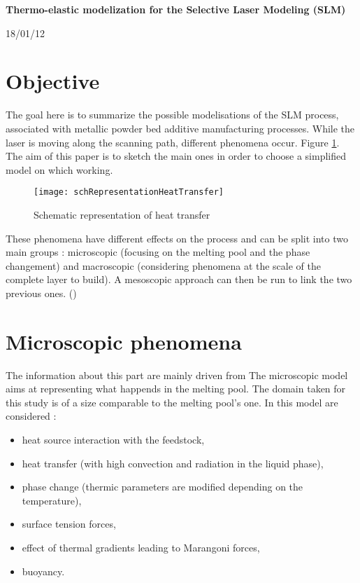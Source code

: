 \documentclass[11pt,a4paper]{article}
\begin{document}
\begin{center}
	\textbf{Thermo-elastic modelization for the Selective Laser Modeling (SLM)}
	
	\vspace{0cm}
	
	18/01/12	
\end{center}

	
\section*{Objective}

The goal here is to summarize the possible modelisations of the SLM process, associated with metallic powder bed additive manufacturing processes. While the laser is moving along the scanning path, different phenomena occur. Figure \ref{fig:schRepresentationHeatTransfer}. The aim of this paper is to sketch the main ones in order to choose a simplified model on which working. 

\begin{figure}[H]
	\centering
	\texttt{[image: schRepresentationHeatTransfer]}
	\caption{Schematic representation of heat transfer \cite{Robertsthreedimensionalfiniteelement2009}}
	\label{fig:schRepresentationHeatTransfer}
\end{figure}

These phenomena have different effects on the process and can be split into two main groups : microscopic (focusing on the melting pool and the phase changement) and macroscopic (considering phenomena at the scale of the complete layer to build). A mesoscopic approach can then be run to link the two previous ones. (\cite{MegahedMetaladditivemanufacturingprocess2016,VanBelleAnalysemodelisationsimulation2013})

\section{Microscopic phenomena} 
The information about this part are mainly driven from \cite{DebRoyAdditivemanufacturingmetallic2018,MegahedMetaladditivemanufacturingprocess2016}
The microscopic model aims at representing what happends in the melting pool. The domain taken for this study is of a size comparable to the melting pool's one. In this model are considered :
\begin{itemize}
	\item heat source interaction with the feedstock,
	\item heat transfer (with high convection and radiation in the liquid phase),
	\item phase change (thermic parameters are modified depending on the temperature),
	\item surface tension forces,
	\item effect of thermal gradients leading to Marangoni forces,
	\item buoyancy.
\end{itemize}
\end{document}
